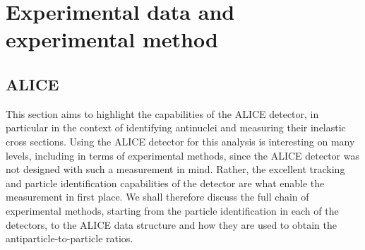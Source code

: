 \section{Experimental data and experimental method}\label{sec:ExperimentAndMethod}

\subsection{ALICE}
This section aims to highlight the capabilities of the ALICE detector, in particular in the context of identifying antinuclei and measuring their inelastic cross sections. Using the ALICE detector for this analysis is interesting on many levels, including in terms of experimental methods, since the ALICE detector was not designed with such a measurement in mind. Rather, the excellent tracking and particle identification capabilities of the detector are what enable the measurement in first place. We shall therefore discuss the full chain of experimental methods, starting from the particle identification in each of the detectors, to the ALICE data structure and how they are used to obtain the antiparticle-to-particle ratios. 

